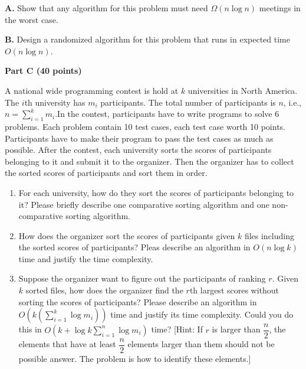 \documentclass{article}
\begin{document}
{\bf A.} Show that any algorithm for this problem must need $\Omega( n
\log{n} )$ meetings in the worst case.

{\bf B.}  Design a randomized algorithm for this problem that runs in
expected time $O ( n \log{n} )$.

\newpage

\begin{center}
{\bf Part C (40 points)}
\end{center}


 A national wide programming contest is hold
at $k$ universities in North America. The $i$th university has $m_{i}$
participants. The total number of participants is $n$, i.e., 
$n = \sum_{i=1}^{k}m_{i}$.In the contest, participants have to write 
programs to solve 6 problems. Each problem contain 10 test cases, each test case
worth 10 points. Participants have to make their program to pass the
test cases as much as possible. After the contest, each university sorts
the scores of participants belonging to it and submit it to the organizer.
Then the organizer has to collect the sorted scores of participants and sort 
them in order. 

\begin{enumerate}

\item For each university, how do they sort the scores of participants
  belonging to it? Please briefly describe one comparative sorting
  algorithm and one non-comparative sorting algorithm.

\item How does the organizer sort the scores of participants given $k$
  files including the sorted scores of participants? Pleas describe an
  algorithm in $O(n\log k)$ time and justify the time complexity.

\item Suppose the organizer want to figure out the participants of
  ranking $r$. Given $k$ sorted files, how does the organizer find the
  $r$th largest scores without sorting the scores of participants? Please 
  describe an algorithm in $O(k(\sum_{i=1}^{k}\log m_{i}))$ time and justify
  its time complexity. Could you do this in $O(k+\log k \sum_{i=1}^{n}\log m_{i})$ time? 
  [Hint: If $r$ is larger than $\dfrac{n}{2}$, the elements that have at least $\dfrac{n}{2}$ 
  elements larger than them should not be possible answer. The problem is how to identify these
  elements.]\\
  

\end{enumerate}
\end{document}
